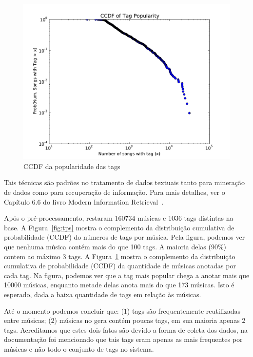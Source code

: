 \documentclass[brazil,a4paper,12pt]{article}
\begin{document}
\begin{figure}
\centering
\includegraphics[scale=0.6]{tpop.pdf}
\caption{CCDF da popularidade das tags}
\label{fig:poptags}
\end{figure}

Tais técnicas são padrões no tratamento de dados textuais 
tanto para mineração de dados como para recuperação de informação.
Para mais detalhes, 
ver o Capítulo 6.6 do livro Modern Information Retrieval~\cite{baeza2010modern}.

Após o pré-processamento, restaram 160734 músicas e 1036 tags distintas na base.
A Figura~\ref{fig:tps} mostra o complemento da distribuição cumulativa de
probabilidade (CCDF) do números de tags por música. Pela figura, 
podemos ver que nenhuma música contém mais do que 100 tags. A maioria delas
(90\%) contem ao máximo 3 tags. A Figura~\ref{fig:poptags} mostra o complemento 
da distribuição cumulativa de probabilidade (CCDF) da quantidade de músicas anotadas 
por cada tag.  Na figura, podemos ver que a tag mais popular chega a anotar mais que 
10000 músicas, enquanto metade delas anota mais do que 173 músicas. Isto é esperado,
dada a baixa quantidade de tags em relação às músicas.

Até o momento podemos concluir que: (1) tags são frequentemente reutilizadas
entre músicas; (2) músicas no gera contém poucas tags, em sua maioria apenas 2 tags. 
Acreditamos que estes dois fatos são devido a forma de coleta dos dados, na documentação
foi mencionado que tais tags eram apenas as mais frequentes por músicas e não todo o conjunto
de tags no sistema.
\end{document}
